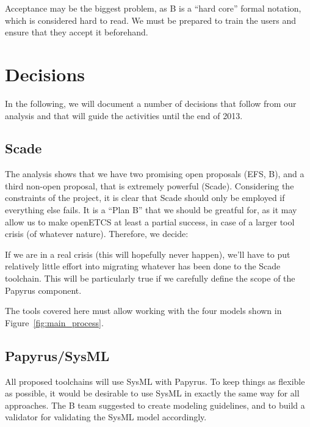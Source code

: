 Acceptance may be the biggest problem, as B is a ``hard core'' formal notation, which is considered hard to read.  We must be prepared to train the users and ensure that they accept it beforehand.

\section{Decisions}

In the following, we will document a number of decisions that follow from our analysis and that will guide the activities until the end of 2013.

\subsection{Scade}

The analysis shows that we have two promising open proposals (EFS, B), and a third non-open proposal, that is extremely powerful (Scade).  Considering the constraints of the project, it is clear that Scade should only be employed if everything else fails.  It is a ``Plan B'' that we should be greatful for, as it may allow us to make openETCS at least a partial success, in case of a larger tool crisis (of whatever nature).  Therefore, we decide:



If we are in a real crisis (this will hopefully never happen), we'll have to put relatively little effort into migrating whatever has been done to the Scade toolchain.  This will be particularly true if we carefully define the scope of the Papyrus component.

The tools covered here must allow working with the four models shown in Figure~\ref{fig:main_process}.

\subsection{Papyrus/SysML}

All proposed toolchains will use SysML with Papyrus.  To keep things as flexible as possible, it would be desirable to use SysML in exactly the same way for all approaches.  The B team suggested to create modeling guidelines, and to build a validator for validating the SysML model accordingly.

